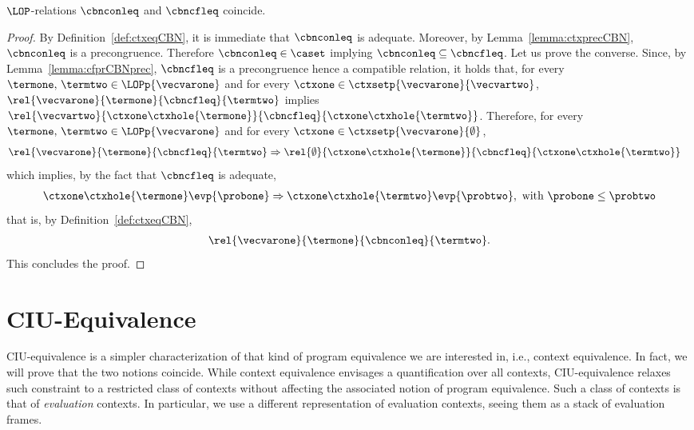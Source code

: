 \begin{lemma}\label{lemma:ctxeq=cfctxpr}
  $\LOP$-relations $\cbnconleq$ and $\cbncfleq$ coincide.
\end{lemma}
\begin{proof}
  By Definition~\ref{def:ctxeqCBN}, it is immediate that $\cbnconleq$ is
  adequate. Moreover, by Lemma~\ref{lemma:ctxprecCBN}, $\cbnconleq$ is a
  precongruence. Therefore $\cbnconleq\in\caset$ implying
  $\cbnconleq\subseteq\cbncfleq$. Let us prove the converse.
  Since, by Lemma~\ref{lemma:cfprCBNprec}, $\cbncfleq$ is a precongruence
  hence a compatible relation, it holds that, for every
  $\termone,\,\termtwo\in\LOPp{\vecvarone}$ and for every
  $\ctxone\in\ctxsetp{\vecvarone}{\vecvartwo}$,
  $\rel{\vecvarone}{\termone}{\cbncfleq}{\termtwo}$ implies
  $\rel{\vecvartwo}{\ctxone\ctxhole{\termone}}{\cbncfleq}{\ctxone\ctxhole{\termtwo}}$.
  Therefore, for every $\termone,\,\termtwo\in\LOPp{\vecvarone}$ and for
  every $\ctxone\in\ctxsetp{\vecvarone}{\emptyset}$,
  \begin{align*}
    \rel{\vecvarone}{\termone}{\cbncfleq}{\termtwo}&\Rightarrow
    \rel{\emptyset}{\ctxone\ctxhole{\termone}}{\cbncfleq}{\ctxone\ctxhole{\termtwo}}
  \end{align*}
  which implies, by the fact that $\cbncfleq$ is adequate,
  \begin{align*}
    \ctxone\ctxhole{\termone}\evp{\probone}\Rightarrow\ctxone\ctxhole{\termtwo}\evp{\probtwo},\textnormal{
      with }\probone\leq\probtwo
  \end{align*}
  that is, by Definition~\ref{def:ctxeqCBN},
  \begin{align*}
    \rel{\vecvarone}{\termone}{\cbnconleq}{\termtwo}.
  \end{align*}
  This concludes the proof.
\end{proof}

\section{CIU-Equivalence}
\label{sec:ciu-eq}


\renewcommand{\ssemn}[2]{#1\Rightarrow_\mathsf{IN} #2}
\renewcommand{\bsemn}[2]{#1\Downarrow_\mathsf{IN} #2}

CIU-equivalence is a simpler characterization of that kind of program
equivalence we are interested in, i.e., context equivalence. In fact, we
will prove that the two notions coincide. While context equivalence
envisages a quantification over all contexts, CIU-equivalence relaxes such
constraint to a restricted class of contexts without affecting the
associated notion of program equivalence. Such a class of contexts is that
of \emph{evaluation} contexts. In particular, we use a different representation of
evaluation contexts, seeing them as a stack of evaluation frames.

